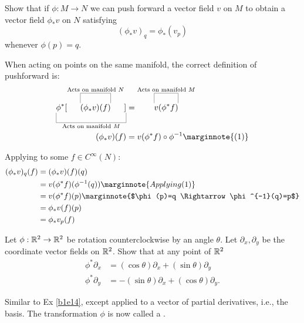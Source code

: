 \documentclass[10pt]{article}
\begin{document}
\begin{example}\label{b1e18}
	Show that if $\phi:M\to N$ we can push forward a vector field $v$ on $M$ to obtain
	a vector field $\phi_*v$ on $N$ satisfying
	$$
	(\phi_*v)_q = \phi_*(v_p)
	$$
	whenever $\phi(p)=q$.
\end{example}
\sol When acting on points on the same manifold, the correct definition of pushforward is:
$$
	\begin{aligned}
		\ub{\phi^*[\ob{(\phi_*v)(f)}{\text{Acts on manifold $N$}}]}{\text{Acts on manifold $M$}} &= \ob{v(\phi^*f)}{\text{Acts on manifold $M$}}\\
		(\phi_*v)(f) &= v(\phi^*f) \circ \phi^{-1}\marginnote{(1)}
	\end{aligned}
$$

Applying to some $f \in C^\infty(N)$:
$$
	\begin{aligned}
		(\phi_*v)_q(f) &= (\phi_*v)(f)(q)\\
		&= v(\phi^*f)(\phi^{-1}(q))\marginnote{Applying (1)}\\
		&= v(\phi^*f)(p)\marginnote{$\phi(p)=q \Rightarrow \phi^{-1}(q)=p$}\\
		&= \phi_*v(f)(p)\\
		&= \phi_*v_p(f)\\
	\end{aligned}
$$


\begin{example}
	Let $\phi:\mathbb{R}^2\to\mathbb{R}^2$ be rotation counterclockwise by an angle $\theta$.
	Let $\partial_x, \partial_y$ be the coordinate vector fields on $\mathbb{R}^2$.
	Show that at any point of $\mathbb{R}^2$
	$$
		\begin{aligned}
			\phi^*\partial_x &= (\cos\theta)\partial_x + (\sin\theta)\partial_y\\
			\phi^*\partial_y &= -(\sin\theta)\partial_x + (\cos\theta)\partial_y.
		\end{aligned}
	$$
\end{example}
\sol Similar to Ex \ref{b1e14}, except applied to a vector of partial derivatives, i.e., the basis. The transformation $\phi$ is now called a .
\end{document}
